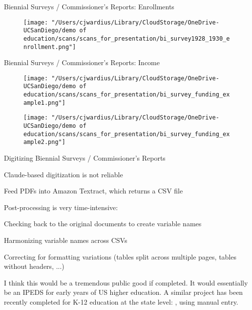 \documentclass[notes,11pt, aspectratio=169]{beamer}
\newenvironment{wideitemize}{\itemize\addtolength{\itemsep}{10pt}}{\enditemize}
\begin{document}
\begin{frame}{Biennial Surveys / Commissioner's Reports: Enrollments}
  \begin{figure}
   \centering
        \texttt{[image: "/Users/cjwardius/Library/CloudStorage/OneDrive-UCSanDiego/demo of education/scans/scans\_for\_presentation/bi\_survey1928\_1930\_enrollment.png"]}
\end{figure}
\end{frame}


\begin{frame}{Biennial Surveys / Commissioner's Reports: Income}
  \begin{figure}
   \centering
   \begin{minipage}{0.48\textwidth}
        \centering
        \texttt{[image: "/Users/cjwardius/Library/CloudStorage/OneDrive-UCSanDiego/demo of education/scans/scans\_for\_presentation/bi\_survey\_funding\_example1.png"]}
   \end{minipage}
   \hfill
   \begin{minipage}{0.48\textwidth}
        \centering
        \texttt{[image: "/Users/cjwardius/Library/CloudStorage/OneDrive-UCSanDiego/demo of education/scans/scans\_for\_presentation/bi\_survey\_funding\_example2.png"]}
   \end{minipage}
\end{figure}
\end{frame}

\begin{frame}{Digitizing Biennial Surveys / Commissioner's Reports}
\begin{wideitemize}
  \item Claude-based digitization is not reliable
  \item Feed PDFs into Amazon Textract, which returns a CSV file
  \item Post-processing is very time-intensive:
  \begin{wideitemize}
    \item Checking back to the original documents to create variable names
    \item Harmonizing variable names across CSVs
    \item Correcting for formatting variations (tables split across multiple pages, tables without headers, ...)
  \end{wideitemize}
  \item I think this would be a tremendous public good if completed. It would essentially be an IPEDS for early years of US higher education. A similar project has been recently completed for K-12 education at the state level: \cite{walsemannStateEducationContextual2025}, using manual entry.
\end{wideitemize}
\end{frame}
\end{document}
